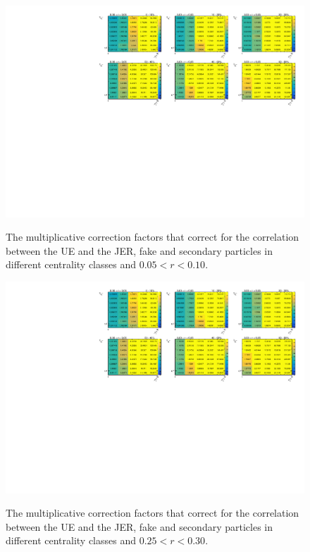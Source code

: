 \begin{figure}[ht]
\centerline{
\includegraphics[page=2,width=1.\textwidth]{figures_UE/UE_factors.pdf} \\
}
\caption{
The multiplicative correction factors that correct for the correlation between the UE and the JER, fake and secondary particles in different centrality classes and $ 0.05 < r < 0.10$.}
\label{fig:UEweights_r2}
\end{figure}

\begin{figure}[ht]
\centerline{
\includegraphics[page=6,width=1.\textwidth]{figures_UE/UE_factors.pdf} \\
}
\caption{
The multiplicative correction factors that correct for the correlation between the UE and the JER, fake and secondary particles in different centrality classes and $ 0.25 < r < 0.30$.}
\label{fig:UEweights_r6}
\end{figure}

